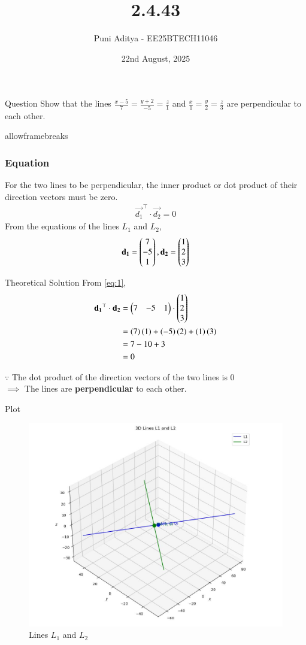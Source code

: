 \documentclass{beamer}
\title{2.4.43}
\date{22nd August, 2025}
\author{Puni Aditya - EE25BTECH11046}
\begin{document}
\frame{\titlepage}
\begin{frame}{Question}
Show that the lines $\frac{x-5}{7}=\frac{y+2}{-5}=\frac{z}{1}$ and $\frac{x}{1}=\frac{y}{2}=\frac{z}{3}$ are perpendicular to each other.
\end{frame}

\begin{frame}{allowframebreaks}
\frametitle{Equation}
For the two lines to be perpendicular, the inner product or dot product of their direction vectors must be zero.
\begin{align}
    \vec{d_1}^\top \cdot \vec{d_2} = 0 \label{eq:1}
\end{align}
From the equations of the lines $L_1$ and $L_2$,
\begin{align}
    \mathbf{d_1} = \begin{pmatrix}7 \\ -5 \\ 1\end{pmatrix}, 
    \mathbf{d_2} = \begin{pmatrix}1 \\ 2 \\ 3\end{pmatrix}
\end{align}
\end{frame}

\begin{frame}{Theoretical Solution}
From \ref{eq:1},
\begin{align}
    \mathbf{d_1}^\top \cdot \mathbf{d_2} &= \begin{pmatrix}7&-5&1\end{pmatrix} \cdot \begin{pmatrix}1 \\ 2 \\ 3\end{pmatrix} \\
    &= \left(7\right)\left(1\right) + \left(-5\right)\left(2\right) + \left(1\right)\left(3\right) \\
    &= 7 - 10 + 3 \\
    &= 0
\end{align}

$\because$ The dot product of the direction vectors of the two lines is 0 \\
$\implies$ The lines are \textbf{perpendicular} to each other.
\end{frame}

\begin{frame}{Plot}
    \begin{figure}
    \centering
    \includegraphics[width=0.5\columnwidth]{../figs/plot_c.jpg}
    \caption{Lines $L_1$ and $L_2$}
    \label{fig:fig}
\end{figure}
\end{frame}
\end{document}
